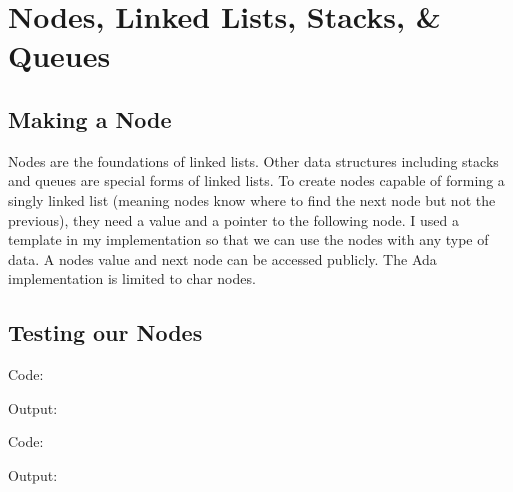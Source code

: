 \documentclass[letterpaper, 10pt]{article}
\begin{document}
\section{Nodes, Linked Lists, Stacks, \& Queues}
\subsection{Making a Node}
Nodes are the foundations of linked lists. Other data structures including stacks and queues are special forms of linked lists. To create nodes capable of forming a singly linked list (meaning nodes know where to find the next node but not the previous), they need a value and a pointer to the following node. I used a template in my implementation so that we can use the nodes with any type of data. A nodes value and next node can be accessed publicly. The Ada implementation is limited to char nodes.


\subsection{Testing our Nodes}
Code:


Output:

Code:

Output:

\end{document}
